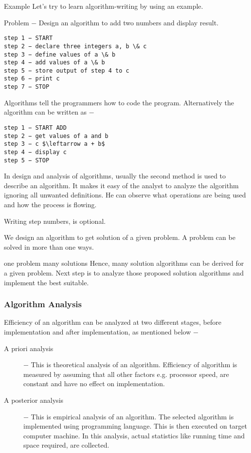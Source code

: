 \documentclass{beamer}
\begin{document}
\begin{frame}[fragile]
Example
Let's try to learn algorithm-writing by using an example.

Problem − Design an algorithm to add two numbers and display result.
\begin{verbatim}
step 1 − START
step 2 − declare three integers a, b \& c
step 3 − define values of a \& b
step 4 − add values of a \& b
step 5 − store output of step 4 to c
step 6 − print c
step 7 − STOP
\end{verbatim}

\end{frame}
\begin{frame}[fragile]
Algorithms tell the programmers how to code the program. Alternatively the algorithm can be written as −
\begin{verbatim}
step 1 − START ADD
step 2 − get values of a and b
step 3 − c $\leftarrow a + b$
step 4 − display c
step 5 − STOP
\end{verbatim}
\end{frame}
\begin{frame}
In design and analysis of algorithms, usually the second method is used to describe an algorithm. It makes it easy of the analyst to analyze the algorithm ignoring all unwanted definitions. He can observe what operations are being used and how the process is flowing.
\end{frame}
\begin{frame}
Writing step numbers, is optional.

We design an algorithm to get solution of a given problem. A problem can be solved in more than one ways.

one problem many solutions
Hence, many solution algorithms can be derived for a given problem. Next step is to analyze those proposed solution algorithms and implement the best suitable.
\end{frame}
\begin{frame}
\frametitle{Algorithm Analysis}
Efficiency of an algorithm can be analyzed at two different stages, before implementation and after implementation, as mentioned below −
\begin{description}
\item[A priori analysis] − This is theoretical analysis of an algorithm. Efficiency of algorithm is measured by assuming that all other factors e.g. processor speed, are constant and have no effect on implementation.

\item[A posterior analysis] − This is empirical analysis of an algorithm. The selected algorithm is implemented using programming language. This is then executed on target computer machine. In this analysis, actual statistics like running time and space required, are collected.
\end{description}
\end{frame}
\end{document}
